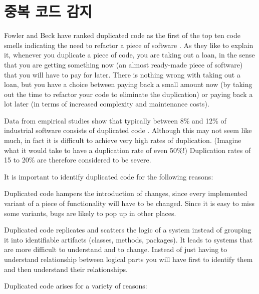 \documentclass[a4paper,10pt,twoside]{book}
\begin{document}
	\renewcommand{\nnbb}[2]{} %
	\sloppy
\fi
\chapter{중복 코드 감지}

Fowler and Beck have ranked duplicated code as the first of the top ten code smells indicating the need to refactor a piece of software \cite{Fowl99a}. As they like to explain it, whenever you duplicate a piece of code, you are taking out a loan, in the sense that you are getting something now (an almost ready-made piece of software) that you will have to pay for later. There is nothing wrong with taking out a loan, but you have a choice between paying back a small amount now (by taking out the time to refactor your code to eliminate the duplication) or paying back a lot later (in terms of increased complexity and maintenance costs).

Data from empirical studies show that typically between 8\% and 12\% of industrial software consists of duplicated code \cite{Duca99b}. Although this may not seem like much, in fact it is difficult to achieve very high rates of duplication. (Imagine what it would take to have a duplication rate of even 50\%!) Duplication rates of 15 to 20\% are therefore considered to be severe. 

It is important to identify duplicated code for the following reasons:

\begin{bulletlist}
\item Duplicated code hampers the introduction of changes, since every implemented variant of a piece of functionality will have to be changed. Since it is easy to miss some variants, bugs are likely to pop up in other places.

\item Duplicated code replicates and scatters the logic of a system instead of grouping it into identifiable artifacts (classes, methods, packages). It leads to systems that are more difficult to understand and to change. Instead of just having to understand relationship between logical parts you will have first to identify them and then understand their relationships.
\end{bulletlist}

Duplicated code arises for a variety of reasons:
\end{document}
